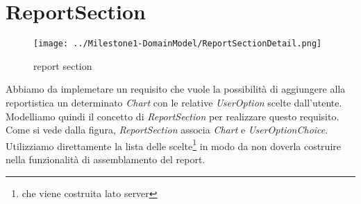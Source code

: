\section{ReportSection}
\label{sec:reportSection}

\begin{figure}[h!] 
	\centering
	\texttt{[image: ../Milestone1-DomainModel/ReportSectionDetail.png]}
	\caption{report section}
	\label{fig:reportSection} 
\end{figure}

Abbiamo da implemetare un requisito che vuole la possibilit\`a di aggiungere
alla reportistica un determinato \emph{Chart} con le relative \emph{UserOption}
scelte dall'utente. Modelliamo quindi il concetto di \emph{ReportSection} per
realizzare questo requisito. Come si vede dalla figura, \emph{ReportSection}
associa \emph{Chart} e \emph{UserOptionChoice}. Utilizziamo direttamente la
lista delle scelte\footnote{che viene costruita lato server} in modo da non
doverla costruire nella funzionalit\`a di assemblamento del report.
